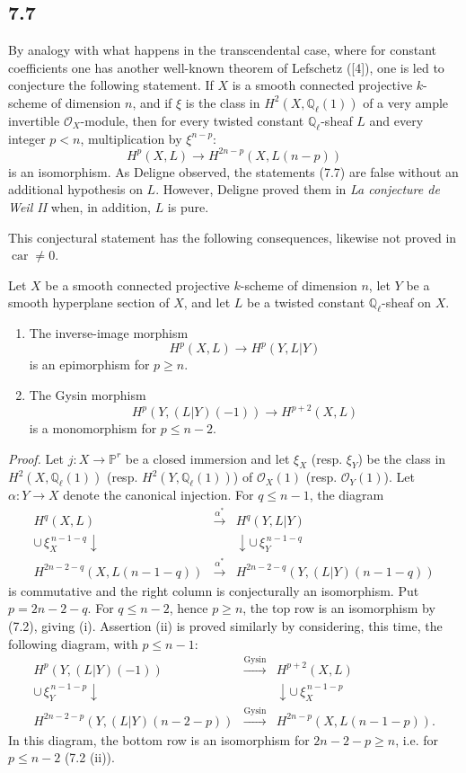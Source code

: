 \documentclass[11pt]{article}
\begin{document}
\subsection*{7.7}

By analogy with what happens in the transcendental case, where for constant coefficients one has another well-known theorem of Lefschetz ([4]), one is led to conjecture the following statement. If $X$ is a smooth connected projective $k$-scheme of dimension $n$, and if $\xi$ is the class in $H^2(X,\mathbb Q_\ell(1))$ of a very ample invertible $\mathcal O_X$-module, then for every twisted constant $\mathbb Q_\ell$-sheaf $L$ and every integer $p<n$, multiplication by $\xi^{n-p}$:
\[
H^p(X,L)\to H^{2n-p}(X,L(n-p))
\]
is an isomorphism. As Deligne observed, the statements (7.7) are false without an additional hypothesis on $L$. However, Deligne proved them in \emph{La conjecture de Weil II} when, in addition, $L$ is pure.

This conjectural statement has the following consequences, likewise not proved in $\operatorname{car}\ne0$.

Let $X$ be a smooth connected projective $k$-scheme of dimension $n$, let $Y$ be a smooth hyperplane section of $X$, and let $L$ be a twisted constant $\mathbb Q_\ell$-sheaf on $X$.
\begin{enumerate}[label=(\roman*)]
\item The inverse-image morphism
\[
H^p(X,L)\to H^p(Y,L|Y)
\]
is an epimorphism for $p\ge n$.
\item The Gysin morphism
\[
H^p(Y,(L|Y)(-1))\to H^{p+2}(X,L)
\]
is a monomorphism for $p\le n-2$.
\end{enumerate}

\emph{Proof.} Let $j:X\to\mathbb P^r$ be a closed immersion and let $\xi_X$ (resp. $\xi_Y$) be the class in $H^2(X,\mathbb Q_\ell(1))$ (resp. $H^2(Y,\mathbb Q_\ell(1))$) of $\mathcal O_X(1)$ (resp. $\mathcal O_Y(1)$). Let $\alpha:Y\to X$ denote the canonical injection. For $q\le n-1$, the diagram
\[
\begin{array}{ccc}
H^q(X,L)&\xrightarrow{\alpha^*}&H^q(Y,L|Y)\\
\cup\,\xi_X^{\,n-1-q}\downarrow&&\downarrow\cup\,\xi_Y^{\,n-1-q}\\
H^{2n-2-q}(X,L(n-1-q))&\xrightarrow{\alpha^*}&
H^{2n-2-q}(Y,(L|Y)(n-1-q))
\end{array}
\]
is commutative and the right column is conjecturally an isomorphism. Put $p=2n-2-q$. For $q\le n-2$, hence $p\ge n$, the top row is an isomorphism by (7.2), giving (i). Assertion (ii) is proved similarly by considering, this time, the following diagram, with $p\le n-1$:
\[
\begin{array}{ccc}
H^p(Y,(L|Y)(-1))&\xrightarrow{\mathrm{Gysin}}&H^{p+2}(X,L)\\
\cup\,\xi_Y^{\,n-1-p}\downarrow&&\downarrow\cup\,\xi_X^{\,n-1-p}\\
H^{2n-2-p}(Y,(L|Y)(n-2-p))&\xrightarrow{\mathrm{Gysin}}&
H^{2n-p}(X,L(n-1-p)).
\end{array}
\]
In this diagram, the bottom row is an isomorphism for $2n-2-p\ge n$, i.e. for $p\le n-2$ (7.2 (ii)).
\end{document}
